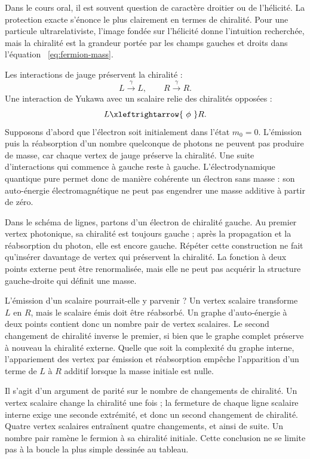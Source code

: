 Dans le cours oral, il est souvent question de caractère droitier ou de l’hélicité. La protection exacte s’énonce le plus clairement en termes de chiralité. Pour une particule ultrarelativiste, l’image fondée sur l’hélicité donne l’intuition recherchée, mais la chiralité est la grandeur portée par les champs gauches et droits dans l’équation ~\eqref{eq:fermion-mass}.

Les interactions de jauge préservent la chiralité :
\begin{equation}
L\xrightarrow{\ \gamma\ }L,
\qquad
R\xrightarrow{\ \gamma\ }R.
\label{eq:gauge-preserves-chirality}
\end{equation}
Une interaction de Yukawa avec un scalaire relie des chiralités opposées :
\begin{equation}
L\xleftrightarrow{\ \phi\ }R.
\label{eq:scalar-flips-chirality}
\end{equation}
Supposons d’abord que l’électron soit initialement dans l’état \(m_0=0\). L’émission puis la réabsorption d’un nombre quelconque de photons ne peuvent pas produire de masse, car chaque vertex de jauge préserve la chiralité. Une suite d’interactions qui commence à gauche reste à gauche. L’électrodynamique quantique pure permet donc de manière cohérente un électron sans masse : son auto-énergie électromagnétique ne peut pas engendrer une masse additive à partir de zéro.

Dans le schéma de lignes, partons d’un électron de chiralité gauche. Au premier vertex photonique, sa chiralité est toujours gauche ; après la propagation et la réabsorption du photon, elle est encore gauche. Répéter cette construction ne fait qu’insérer davantage de vertex qui préservent la chiralité. La fonction à deux points externe peut être renormalisée, mais elle ne peut pas acquérir la structure gauche-droite qui définit une masse.

L’émission d’un scalaire pourrait-elle y parvenir ? Un vertex scalaire transforme \(L\) en \(R\), mais le scalaire émis doit être réabsorbé. Un graphe d’auto-énergie à deux points contient donc un nombre pair de vertex scalaires. Le second changement de chiralité inverse le premier, si bien que le graphe complet préserve à nouveau la chiralité externe. Quelle que soit la complexité du graphe interne, l’appariement des vertex par émission et réabsorption empêche l’apparition d’un terme de \(L\) à \(R\) additif lorsque la masse initiale est nulle.

Il s’agit d’un argument de parité sur le nombre de changements de chiralité. Un vertex scalaire change la chiralité une fois ; la fermeture de chaque ligne scalaire interne exige une seconde extrémité, et donc un second changement de chiralité. Quatre vertex scalaires entraînent quatre changements, et ainsi de suite. Un nombre pair ramène le fermion à sa chiralité initiale. Cette conclusion ne se limite pas à la boucle la plus simple dessinée au tableau.

